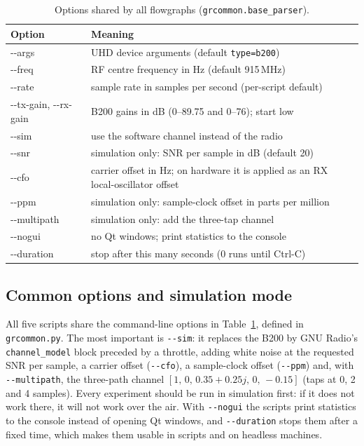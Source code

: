 \begin{table}[htbp]\centering\small
\caption{Options shared by all flowgraphs (\texttt{grcommon.base\_parser}).}\label{tab:appB:gropts}
\begin{tabularx}{\linewidth}{@{}>{\ttfamily}l>{\raggedright\arraybackslash}X@{}}
\toprule
\normalfont Option & Meaning\\
\midrule
-{}-args & UHD device arguments (default \texttt{type=b200})\\
-{}-freq & RF centre frequency in Hz (default 915\,MHz)\\
-{}-rate & sample rate in samples per second (per-script default)\\
-{}-tx-gain, -{}-rx-gain & B200 gains in dB (0--89.75 and 0--76); start low\\
-{}-sim & use the software channel instead of the radio\\
-{}-snr & simulation only: SNR per sample in dB (default 20)\\
-{}-cfo & carrier offset in Hz; on hardware it is applied as an RX local-oscillator offset\\
-{}-ppm & simulation only: sample-clock offset in parts per million\\
-{}-multipath & simulation only: add the three-tap channel\\
-{}-nogui & no Qt windows; print statistics to the console\\
-{}-duration & stop after this many seconds (0 runs until Ctrl-C)\\
\bottomrule
\end{tabularx}
\end{table}

\subsection{Common options and simulation mode}

All five scripts share the command-line options in Table~\ref{tab:appB:gropts}, defined in
\texttt{grcommon.py}. The most important is \texttt{-{}-sim}: it replaces the B200 by GNU Radio's
\texttt{channel\_model} block preceded by a throttle, adding white noise at the requested SNR per
sample, a carrier offset (\texttt{-{}-cfo}), a sample-clock offset (\texttt{-{}-ppm}) and, with
\texttt{-{}-multipath}, the three-path channel $[1,\,0,\,0.35+0.25j,\,0,\,-0.15]$ (taps at 0, 2 and 4
samples). Every experiment should be run in simulation first: if it does not work there, it will not
work over the air. With \texttt{-{}-nogui} the scripts print statistics to the console instead of
opening Qt windows, and \texttt{-{}-duration} stops them after a fixed time, which makes them usable in
scripts and on headless machines.

